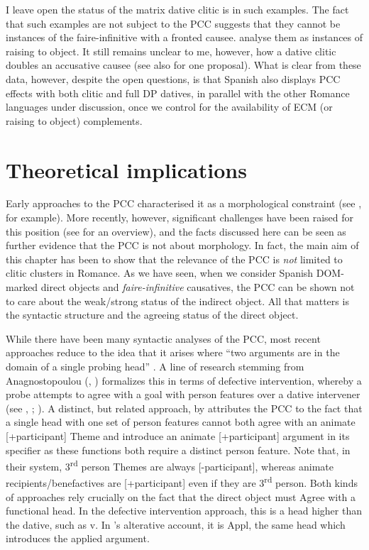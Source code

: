 \documentclass[output=paper,colorlinks,citecolor=brown,nonflat]{./langscibook}
\begin{document}
I leave open the status of the matrix dative clitic is in such examples. The fact that such examples are not subject to the PCC suggests that they cannot be instances of the faire-infinitive with a fronted causee. \citet{OrmazabalRomero2013Borealis} analyse them as instances of raising to object. It still remains unclear to me, however, how a dative clitic doubles an accusative causee (see also \citealt{OrdóñezSaab2017} for one proposal). What is clear from these data, however, despite the open questions, is that Spanish also displays PCC effects with both clitic and full DP datives, in parallel with the other Romance languages under discussion, once we control for the availability of ECM (or raising to object) complements.

\section{Theoretical implications}\label{sec:sheehan:5}

Early approaches to the PCC characterised it as a morphological constraint (see \citealt{Bonet1991}, for example). More recently, however, significant challenges have been raised for this position (see \citealt{Preminger2019} for an overview), and the facts discussed here can be seen as further evidence that the PCC is not about morphology. In fact, the main aim of this chapter has been to show that the relevance of the PCC is \textit{not} limited to clitic clusters in Romance. As we have seen, when we consider Spanish DOM-marked direct objects and \textit{faire-infinitive} causatives, the PCC can be shown not to care about the weak/strong status of the indirect object. All that matters is the syntactic structure and the agreeing status of the direct object. 

While there have been many syntactic analyses of the PCC, most recent approaches reduce to the idea that it arises where “two arguments are in the domain of a single probing head” \citep[290]{Nevins2007}. A line of research stemming from Anagnostopoulou (\citeyear{Anagnostopoulou2003}, \citeyear{Anagnostopoulou2005}) formalizes this in terms of defective intervention, whereby a probe attempts to agree with a goal with person features over a dative intervener (see \citealt{Anagnostopoulou2003}, \citeyear{Anagnostopoulou2005}; \citealt{Nevins2007, Rezac2008, Preminger2019}). A distinct, but related approach, by \citet{AdgerHarbour2007} attributes the PCC to the fact that a single head with one set of person features cannot both agree with an animate [+participant] Theme and introduce an animate [+participant] argument in its specifier as these functions both require a distinct person feature. Note that, in their system, 3\textsuperscript{rd} person Themes are always [-participant], whereas animate recipients/benefactives are [+participant] even if they are 3\textsuperscript{rd} person.  Both kinds of approaches rely crucially on the fact that the direct object must Agree with a functional head. In the defective intervention approach, this is a head higher than the dative, such as v. In \citeauthor{AdgerHarbour2007}’s alterative account, it is Appl, the same head which introduces the applied argument. 
\end{document}
